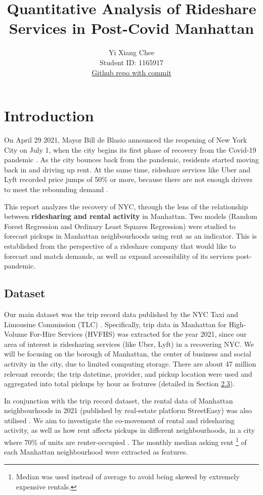 \documentclass[11pt]{article}
\title{\textbf{Quantitative Analysis of Rideshare Services in Post-Covid Manhattan}
}
\author{
Yi Xiang Chee \\
Student ID: 1165917 \\
\href{https://github.com/MAST30034-Applied-Data-Science/mast30034-project-1-yixiangchee/commit/ef32a216a4460b503df59cc0e2c7d75442de66cc}{Github repo with commit}
}
\begin{document}
\maketitle

\section{Introduction}

On April 29 2021, Mayor Bill de Blasio announced the reopening of New York City on July 1, when the city begins its first phase of recovery from the Covid-19 pandemic \cite{nycrecovery}. As the city bounces back from the pandemic, residents started moving back in and driving up rent. At the same time, rideshare services like Uber and Lyft recorded price jumps of 50\% or more, because there are not enough drivers to meet the rebounding demand \cite{pricesurge}.

This report analyzes the recovery of NYC, through the lens of the relationship between \textbf{ridesharing and rental activity} in Manhattan. Two models (Random Forest Regression and Ordinary Least Squares Regression) were studied to forecast pickups in Manhattan neighbourhoods using rent as an indicator. This is established from the perspective of a rideshare company that would like to forecast and match demands, as well as expand accessibility of its services post-pandemic.

\subsection{Dataset}

Our main dataset was the trip record data published by the NYC Taxi and Limousine Commission (TLC) \cite{tripdata}. Specifically, trip data in Manhattan for High-Volume For-Hire Services (HVFHS) was extracted for the year 2021, since our area of interest is ridesharing services (like Uber, Lyft) in a recovering NYC. We will be focusing on the borough of Manhattan, the center of business and social activity in the city, due to limited computing storage. There are about 47 million relevant records; the trip datetime, provider, and pickup location were used and aggregated into total pickups by hour as features (detailed in Section \hyperlink{subsection.2.3}{2.3}).

In conjunction with the trip record dataset, the rental data of Manhattan neighbourhoods in 2021 (published by real-estate platform StreetEasy) was also utilised \cite{rentaldata}. We aim to investigate the co-movement of rental and ridesharing activity, as well as how rent affects pickups in different neighbourhoods, in a city where 70\% of units are renter-occupied \cite{renter}. The monthly median asking rent \footnote{Median was used instead of average to avoid being skewed by extremely expensive rentals.} of each Manhattan neighbourhood were extracted as features.
\end{document}

